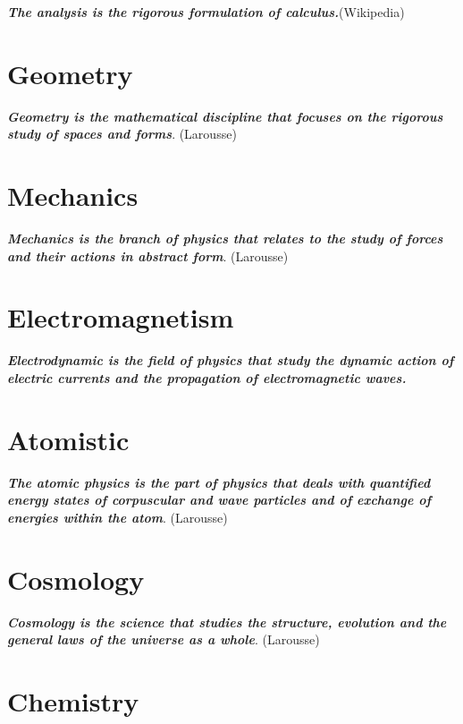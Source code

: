 \documentclass[12pt,a4paper,twoside,openright]{report}
\theoremstyle{definition}
\theoremstyle{itexmp}
\numberwithin{equation}{section}
\begin{document}
	\textit{\textbf{The analysis is the rigorous formulation of calculus.}}(Wikipedia)
	\minitoc
	\pagebreak
	
		
\chapter{Geometry}

	\textit{\textbf{Geometry is the mathematical discipline that focuses on the rigorous study of spaces and forms}}. (Larousse)
	\minitoc
	\pagebreak
	
	
\chapter{Mechanics}

	\textit{\textbf{Mechanics is the branch of physics that relates to the study of forces and their actions in abstract form}}. (Larousse)
	\minitoc
	
	
\chapter{Electromagnetism}

	\textit{\textbf{Electrodynamic is the field of physics that study the dynamic action of electric currents and the propagation of electromagnetic waves.}}
	\minitoc
	\pagebreak
	

\chapter{Atomistic}

	\textit{\textbf{The atomic physics is the part of physics that deals with quantified energy states of corpuscular and wave particles and of exchange of energies within the atom}}. (Larousse)
	\minitoc
	\pagebreak
	
	

\chapter{Cosmology}

	\textit{\textbf{Cosmology is the science that studies the structure, evolution and the general laws of the universe as a whole}}. (Larousse)
	\minitoc
	\pagebreak
	

	
\chapter{Chemistry}
\end{document}
